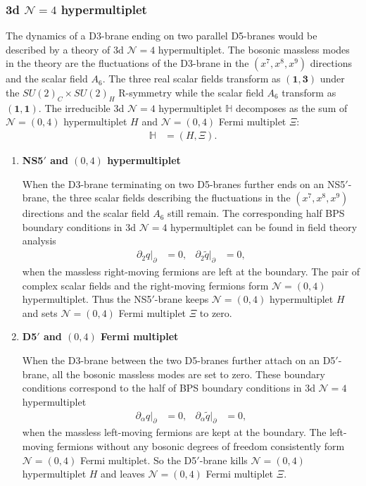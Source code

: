 \documentclass{article}
\numberwithin{equation}{section}
\begin{document}
\subsubsection{3d $\mathcal{N}=4$ hypermultiplet}
\label{subsec_04BC2}
The dynamics of a D3-brane ending on two parallel D5-branes 
would be described by a theory of 3d $\mathcal{N}=4$ hypermultiplet. 
The bosonic massless modes in the theory are 
the fluctuations of the D3-brane in the $(x^{7}, x^{8}, x^{9})$ directions and the scalar field $A_{6}$. 
The three real scalar fields transform as 
$(\bm{1},\bm{3})$ under the $SU(2)_{C}\times SU(2)_{H}$ R-symmetry 
while the scalar field $A_{6}$ transform as $(\bm{1},\bm{1})$. 
The irreducible 3d $\mathcal{N}=4$ hypermultiplet $\mathbb{H}$ 
decomposes as the sum of $\mathcal{N}=(0,4)$ hypermultiplet $H$ and $\mathcal{N}=(0,4)$ Fermi multiplet $\Xi$:
\begin{align}
\label{3d4_h_half}
\mathbb{H}&=(H, \Xi). 
\end{align}


\begin{enumerate}

\item \textbf{NS5$'$ and $(0,4)$ hypermultiplet}

When the D3-brane terminating on two D5-branes further ends on an NS5$'$-brane, 
the three scalar fields describing the fluctuations in the  $(x^{7}, x^{8}, x^{9})$ directions 
and the scalar field $A_{6}$ still remain. 
The corresponding half BPS boundary conditions in 
3d $\mathcal{N}=4$ hypermultiplet can be found in field theory analysis 
\begin{align}
\label{half_h1}
\partial_{2}q |_{\partial}&=0,& 
\partial_{2}\widetilde{q} |_{\partial}&=0, 
\end{align}
when the massless right-moving fermions are left at the boundary. 
The pair of complex scalar fields and the right-moving fermions form $\mathcal{N}=(0,4)$ hypermultiplet. 
Thus the NS5$'$-brane keeps $\mathcal{N}=(0,4)$ hypermultiplet $H$ 
and sets $\mathcal{N}=(0,4)$ Fermi multiplet $\Xi$ to zero. 

\item \textbf{D5$'$ and $(0,4)$ Fermi multiplet}

When the D3-brane between the two D5-branes further attach on an D5$'$-brane, 
all the bosonic massless modes are set to zero. 
These boundary conditions correspond to the half of BPS boundary conditions in 
3d $\mathcal{N}=4$ hypermultiplet 
\begin{align}
\label{half_h2}
\partial_{\alpha}q |_{\partial}&=0,&
\partial_{\alpha}\widetilde{q} |_{\partial}&=0, 
\end{align}
when the massless left-moving fermions are kept at the boundary. 
The left-moving fermions without any bosonic degrees of freedom 
consistently form $\mathcal{N}=(0,4)$ Fermi multiplet. 
So the D5$'$-brane kills $\mathcal{N}=(0,4)$ hypermultiplet $H$ 
and leaves $\mathcal{N}=(0,4)$ Fermi multiplet $\Xi$. 


\end{enumerate}
\end{document}
